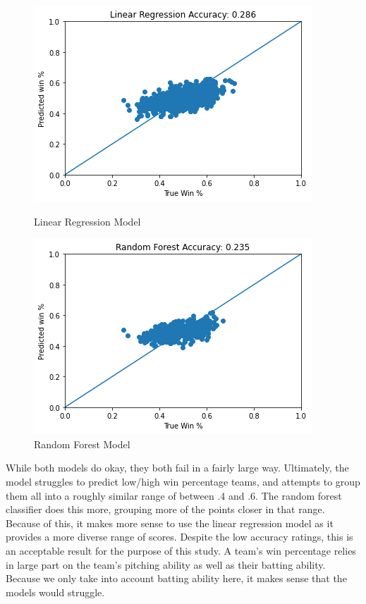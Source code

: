 \documentclass{article}
\begin{document}
\begin{figure}[!tbp]
  \centering
  \begin{minipage}[b]{0.4\textwidth}
    \includegraphics[width=\textwidth]{lr_acc.png}
    \caption{Linear Regression Model}
    \label{fig:lr_acc}
  \end{minipage}
  \hfill
  \begin{minipage}[b]{0.4\textwidth}
    \includegraphics[width=\textwidth]{rf_acc.png}
    \caption{Random Forest Model}
    \label{fig:rf_acc}
  \end{minipage}
\end{figure}


While both models do okay, they both fail in a fairly large way. Ultimately, the model struggles to predict low/high win percentage teams, and attempts to group them all into a roughly similar range of between .4 and .6. The random forest classifier does this more, grouping more of the points closer in that range. Because of this, it makes more sense to use the linear regression model as it provides a more diverse range of scores. Despite the low accuracy ratings, this is an acceptable result for the purpose of this study. A team’s win percentage relies in large part on the team's pitching ability as well as their batting ability. Because we only take into account batting ability here, it makes sense that the models would struggle. 
\end{document}
